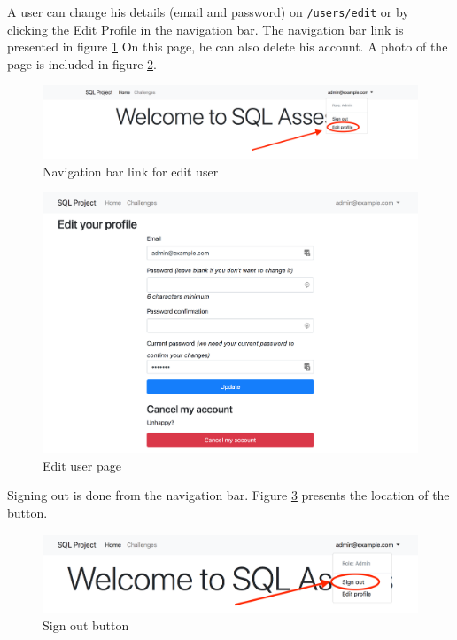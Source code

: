 A user can change his details (email and password) on \texttt{/users/edit} or by clicking the Edit Profile in the navigation bar. The navigation bar link is presented in figure \ref{fig:app:editusernavbar} On this page, he can also delete his account. A photo of the page is included in figure \ref{fig:app:edituser}.

\begin{figure}[ht]
    \centering
    \includegraphics[width=\textwidth/4*3]{Appendices/editlinknavbar.png}
    \caption{Navigation bar link for edit user}
    \label{fig:app:editusernavbar}
\end{figure}

\begin{figure}[ht]
    \centering
    \includegraphics[width=\textwidth/4*3]{Appendices/edituser.png}
    \caption{Edit user page}
    \label{fig:app:edituser}
\end{figure}

Signing out is done from the navigation bar. Figure \ref{fig:app:signout} presents the location of the button.

\begin{figure}[ht]
    \centering
    \includegraphics[width=\textwidth/4*3]{Appendices/signout.png}
    \caption{Sign out button}
    \label{fig:app:signout}
\end{figure}

